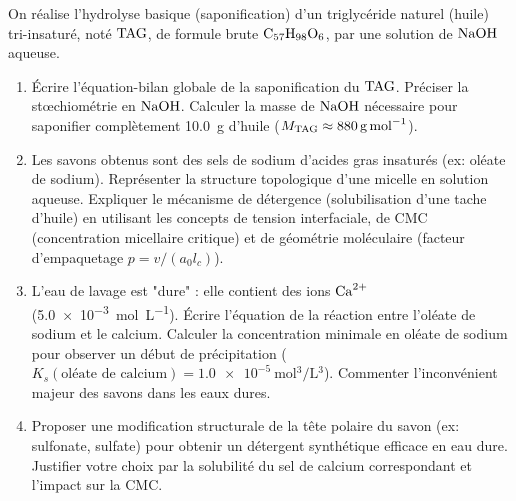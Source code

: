 \documentclass[11pt]{article}
\begin{document}
\begin{exercice}
On réalise l'hydrolyse basique (saponification) d'un triglycéride naturel (huile) tri-insaturé, noté $\ce{TAG}$, de formule brute $\ce{C57H98O6}$, par une solution de $\ce{NaOH}$ aqueuse.
\begin{enumerate}
    \item Écrire l'équation-bilan globale de la saponification du $\ce{TAG}$. Préciser la stœchiométrie en $\ce{NaOH}$. Calculer la masse de $\ce{NaOH}$ nécessaire pour saponifier complètement \SI{10,0}{\g} d'huile ($M_{\ce{TAG}} \approx \SI{880}{\g\per\mol}$).
    \item Les savons obtenus sont des sels de sodium d'acides gras insaturés (ex: oléate de sodium). Représenter la structure topologique d'une micelle en solution aqueuse. Expliquer le mécanisme de détergence (solubilisation d'une tache d'huile) en utilisant les concepts de tension interfaciale, de CMC (concentration micellaire critique) et de géométrie moléculaire (facteur d'empaquetage $p = v/(a_0 l_c)$).
    \item L'eau de lavage est "dure" : elle contient des ions $\ce{Ca^{2+}}$ (\SI{5,0e-3}{\mol\per\L}). Écrire l'équation de la réaction entre l'oléate de sodium et le calcium. Calculer la concentration minimale en oléate de sodium pour observer un début de précipitation ($K_s(\text{oléate de calcium}) = \SI{1,0e-5}{\mol^3\per\L^3}$). Commenter l'inconvénient majeur des savons dans les eaux dures.
    \item Proposer une modification structurale de la tête polaire du savon (ex: sulfonate, sulfate) pour obtenir un détergent synthétique efficace en eau dure. Justifier votre choix par la solubilité du sel de calcium correspondant et l'impact sur la CMC.
\end{enumerate}
\end{exercice}
\end{document}
